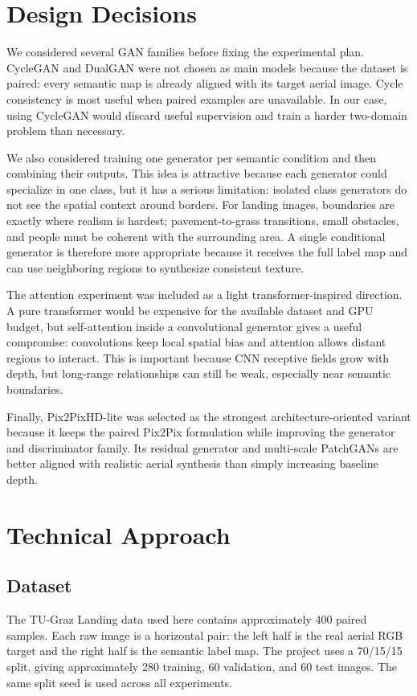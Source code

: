 \documentclass[conference]{IEEEtran}
\begin{document}
\section{Design Decisions}
We considered several GAN families before fixing the experimental plan. CycleGAN and DualGAN were not chosen as main models because the dataset is paired: every semantic map is already aligned with its target aerial image. Cycle consistency is most useful when paired examples are unavailable. In our case, using CycleGAN would discard useful supervision and train a harder two-domain problem than necessary.

We also considered training one generator per semantic condition and then combining their outputs. This idea is attractive because each generator could specialize in one class, but it has a serious limitation: isolated class generators do not see the spatial context around borders. For landing images, boundaries are exactly where realism is hardest; pavement-to-grass transitions, small obstacles, and people must be coherent with the surrounding area. A single conditional generator is therefore more appropriate because it receives the full label map and can use neighboring regions to synthesize consistent texture.

The attention experiment was included as a light transformer-inspired direction. A pure transformer would be expensive for the available dataset and GPU budget, but self-attention inside a convolutional generator gives a useful compromise: convolutions keep local spatial bias and attention allows distant regions to interact. This is important because CNN receptive fields grow with depth, but long-range relationships can still be weak, especially near semantic boundaries.

Finally, Pix2PixHD-lite was selected as the strongest architecture-oriented variant because it keeps the paired Pix2Pix formulation while improving the generator and discriminator family. Its residual generator and multi-scale PatchGANs are better aligned with realistic aerial synthesis than simply increasing baseline depth.

\section{Technical Approach}
\subsection{Dataset}
The TU-Graz Landing data used here contains approximately 400 paired samples. Each raw image is a horizontal pair: the left half is the real aerial RGB target and the right half is the semantic label map. The project uses a 70/15/15 split, giving approximately 280 training, 60 validation, and 60 test images. The same split seed is used across all experiments.
\end{document}
